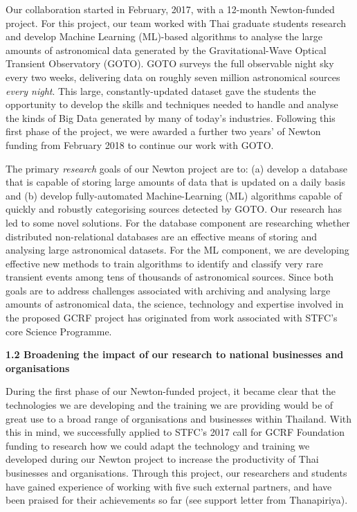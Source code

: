 \documentclass[11pt]{article}
\begin{document}
  \vspace{2mm}
  \noindent
  Our collaboration started in February, 2017, with a 12-month Newton-funded project. For this project, our team worked with Thai graduate students research and develop Machine Learning (ML)-based algorithms to analyse the large amounts of astronomical data generated by the Gravitational-Wave Optical Transient Observatory (GOTO). GOTO surveys the full observable night sky every two weeks, delivering data on roughly seven million astronomical sources {\it every night}. This large, constantly-updated dataset gave the students the opportunity to develop the skills and techniques needed to handle and analyse the kinds of Big Data generated by many of today's industries. Following this first phase of the project, we were awarded a further two years' of Newton funding from February 2018 to continue our work with GOTO. 
  
  \vspace{2mm}
  \noindent
  The primary {\it research} goals of our Newton project are to: (a) develop a database that is capable of storing large amounts of data that is updated on a daily basis and (b) develop fully-automated Machine-Learning (ML) algorithms capable of quickly and robustly categorising sources detected by GOTO. Our research has led to some novel solutions. For the database component are researching whether distributed non-relational databases are an effective means of storing and analysing large astronomical datasets. For the ML component, we are developing effective new methods to train algorithms to identify and classify very rare transient events among tens of thousands of astronomical sources. Since both goals are to address challenges associated with archiving and analysing large amounts of astronomical data, the science, technology and expertise involved in the proposed GCRF project has originated from work associated with STFC's core Science Programme. 
  
  \vspace{3mm}
  \noindent
  {\large \bf 1.2 Broadening the impact of our research to national businesses and organisations}
  
  \noindent
  During the first phase of our Newton-funded project, it became clear that the technologies we are developing and the training we are providing would be of great use to a broad range of organisations and businesses within Thailand. With this in mind, we successfully applied to STFC's 2017 call for GCRF Foundation funding to research how we could adapt the technology and training we developed during our Newton project to increase the productivity of Thai businesses and organisations. Through this project, our researchers and students have gained experience of working with five such external partners, and have been praised for their achievements so far (see support letter from Thanapiriya).
  
\end{document}
